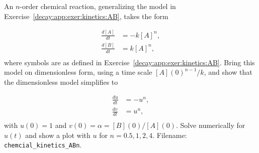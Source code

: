 \documentclass[graybox,sectrefs,envcountresetchap,open=right,final]{svmonodo}
\makeatletter
\newenvironment{doconceexercise}{}{}
\newcounter{doconceexercisecounter}%
\newcommand\listofexercises{
\chapter*{List of Exercises, Problems, and Projects
          \@mkboth{List of Exercises, Problems, and Projects}{List of Exercises, Problems, and Projects}}
\markboth{List of Exercises, Problems, and Projects}{List of Exercises, Problems, and Projects}
\@starttoc{loe}
}
\makeatother
\begin{document}
\begin{doconceexercise}

                
\label{decay:app:exer:kinetics:ABn}

An $n$-order chemical reaction, generalizing the model in
Exercise~\ref{decay:app:exer:kinetics:AB}, takes the form

\begin{align*}
\frac{d[A]}{dt} &= -k[A]^n,\\ 
\frac{d[B]}{dt} &= k[A]^n,\\ 
\end{align*}
where symbols are as defined in Exercise~\ref{decay:app:exer:kinetics:AB}.
Bring this model on dimensionless form, using a time scale $[A](0)^{n-1}/k$,
and show that the dimensionless model simplifies to

\begin{align*}
\frac{du}{dt} &= -u^n,\\ 
\frac{dv}{dt} &= u^n,\\ 
\end{align*}
with $u(0)=1$ and $v(0)=\alpha = [B](0)/[A](0)$. Solve numerically for
$u(t)$ and show a plot with $u$ for $n=0.5, 1, 2, 4$.
\noindent Filename: \Verb!chemcial_kinetics_ABn!.

\end{doconceexercise}
\end{document}
